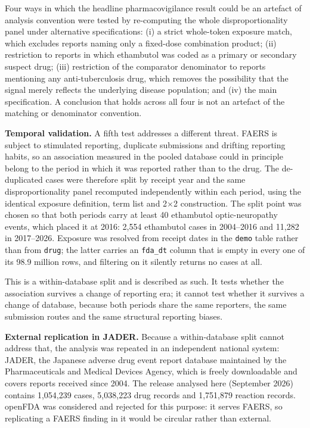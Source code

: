 \documentclass[utf8]{FrontiersinVancouver}
\begin{document}
Four ways in which the headline pharmacovigilance result could be an artefact of analysis convention were tested by re-computing the whole disproportionality panel under alternative specifications: (i) a strict whole-token exposure match, which excludes reports naming only a fixed-dose combination product; (ii) restriction to reports in which ethambutol was coded as a primary or secondary suspect drug; (iii) restriction of the comparator denominator to reports mentioning any anti-tuberculosis drug, which removes the possibility that the signal merely reflects the underlying disease population; and (iv) the main specification. A conclusion that holds across all four is not an artefact of the matching or denominator convention.

\textbf{Temporal validation.} A fifth test addresses a different threat. FAERS is subject to stimulated reporting, duplicate submissions and drifting reporting habits, so an association measured in the pooled database could in principle belong to the period in which it was reported rather than to the drug. The de-duplicated cases were therefore split by receipt year and the same disproportionality panel recomputed independently within each period, using the identical exposure definition, term list and 2$\times$2 construction. The split point was chosen so that both periods carry at least 40 ethambutol optic-neuropathy events, which placed it at 2016: 2,554 ethambutol cases in 2004--2016 and 11,282 in 2017--2026. Exposure was resolved from receipt dates in the \texttt{demo} table rather than from \texttt{drug}; the latter carries an \texttt{fda\_dt} column that is empty in every one of its 98.9 million rows, and filtering on it silently returns no cases at all.

This is a within-database split and is described as such. It tests whether the association survives a change of reporting era; it cannot test whether it survives a change of database, because both periods share the same reporters, the same submission routes and the same structural reporting biases.

\textbf{External replication in JADER.} Because a within-database split cannot address that, the analysis was repeated in an independent national system: JADER, the Japanese adverse drug event report database maintained by the Pharmaceuticals and Medical Devices Agency, which is freely downloadable and covers reports received since 2004. The release analysed here (September 2026) contains 1,054,239 cases, 5,038,223 drug records and 1,751,879 reaction records. openFDA was considered and rejected for this purpose: it serves FAERS, so replicating a FAERS finding in it would be circular rather than external.
\end{document}
